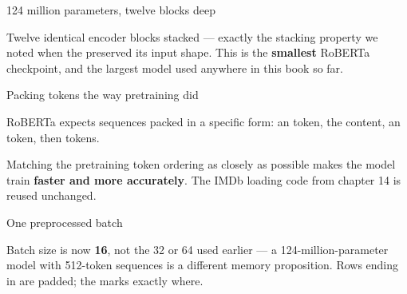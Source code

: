 \documentclass[aspectratio=169,11pt,t]{beamer}
\begin{document}
\begin{frame}[shrink=25]{124 million parameters, twelve blocks deep}
{\fontsize{9.4}{12.6}\selectfont\color{fg2}Twelve identical encoder blocks stacked --- exactly the stacking property we noted when the  preserved its input shape. This is the \textbf{smallest} RoBERTa checkpoint, and the largest model used anywhere in this book so far.\par}\vskip 4pt
\end{frame}

\begin{frame}[shrink=25]{Packing tokens the way pretraining did}
{\fontsize{9.4}{12.6}\selectfont\color{fg2}RoBERTa expects sequences packed in a specific form: an  token, the content, an  token, then  tokens.\par}\vskip 4pt
{\fontsize{9.4}{12.6}\selectfont\color{fg2}Matching the pretraining token ordering as closely as possible makes the model train \textbf{faster and more accurately}. The IMDb loading code from chapter 14 is reused unchanged.\par}\vskip 4pt
\end{frame}

\begin{frame}[shrink=25]{One preprocessed batch}
{\fontsize{9.4}{12.6}\selectfont\color{fg2}Batch size is now \textbf{16}, not the 32 or 64 used earlier --- a 124-million-parameter model with 512-token sequences is a different memory proposition. Rows ending in  are padded; the  marks exactly where.\par}\vskip 4pt
\end{frame}
\end{document}
